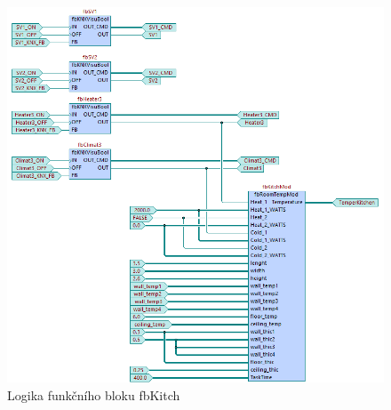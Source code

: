 \begin{figure}[!ht]
  \begin{center}
  \includegraphics[scale=0.7]{obrazky/fbKitch.png}
  \end{center}
  \caption[Logika funkčního bloku fbKitch]{Logika funkčního bloku fbKitch}
  \label{fig:fbKitch}
\end{figure}

\pagebreak
